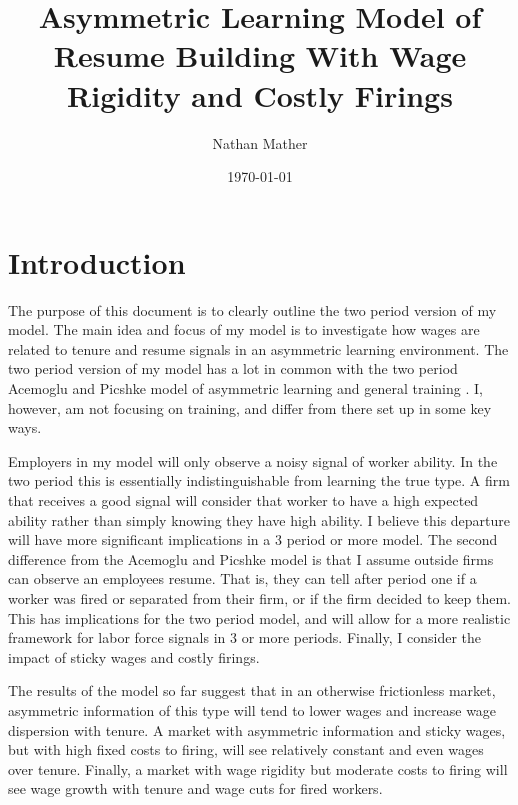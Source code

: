 \documentclass[11pt]{article}
\title{Asymmetric Learning Model of Resume Building With Wage Rigidity and Costly Firings} %
\author{Nathan Mather} %
\date{\today} %
\begin{document}
	
	
	\maketitle %
	
	\setcounter{tocdepth}{3} %
	
	\tableofcontents %
	
	\section{Introduction}
	The purpose of this document is to clearly outline the two period version of my model. The main idea and focus of my model is to investigate how wages are related to tenure and resume signals in an asymmetric learning environment. The two period version of my model has a lot in common with the two period Acemoglu and Picshke model of asymmetric learning and general training \cite{AP_1998}. I, however, am not focusing on training, and differ from there set up in some key ways. \par
	
	Employers in my model will only observe a noisy signal of worker ability. In the two period this is essentially indistinguishable from learning the true type. A firm that receives a good signal will consider that worker to have a high expected ability rather than simply knowing they have high ability. I believe this departure will have more significant implications in a 3 period or more model. The second difference from the Acemoglu and Picshke model is that I assume outside firms can observe an employees resume. That is,  they can tell after period one if a worker was fired or separated from their firm, or if the firm decided to keep them. This has implications for the two period model, and will allow for a more realistic framework for labor force signals in 3 or more periods. Finally, I consider the impact of sticky wages and costly firings.  \par 


	The results of the model so far suggest that in an otherwise frictionless market, asymmetric information of this type will tend to lower wages and increase wage dispersion with tenure. A market with asymmetric information and sticky wages, but with high fixed costs to firing, will see relatively constant and even wages over tenure. Finally, a market with wage rigidity but moderate costs to firing will see wage growth with tenure and wage cuts for fired workers. 
\end{document}
